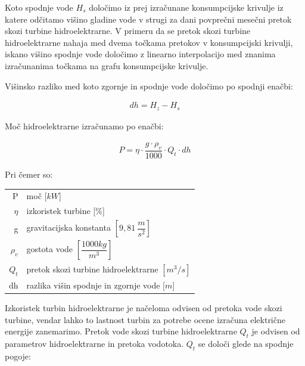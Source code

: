  Koto spodnje vode $H_s$ določimo iz prej izračunane konsumpcijske krivulje iz katere odčitamo višino gladine vode v strugi za dani povprečni mesečni pretok skozi turbine hidroelektrarne. V primeru da se pretok skozi turbine hidroelektrarne nahaja med dvema točkama pretokov v konsumpcijski krivulji, iskano višino spodnje vode določimo z linearno interpolacijo med znanima izračunanima točkama na grafu konsumpcijske krivulje.


Višinsko razliko med koto zgornje in spodnje vode določimo po spodnji enačbi:

\begin{ceqn}
\begin{align}
dh = H_z - H_s
\end{align}
\end{ceqn}

Moč hidroelektrarne izračunamo po enačbi:

\begin{ceqn}
\begin{align}
P = \eta \cdot \dfrac{g \cdot \rho_v}{1000} \cdot Q_t \cdot dh \label{eq:mocHidroelektrarne}
\end{align}
\end{ceqn}

Pri čemer so:
\begin{table}[htb!]
	\begin{tabular}{r|p{10cm}}
		P & moč [$kW$]\\
		$\eta$ & izkoristek turbine [\%]\\
		g & gravitacijska konstanta $\left[9,81~\dfrac{m}{s^{2}}\right]$ \\
		$\rho_v$&gostota vode $\left[\dfrac{1000 kg}{m^3}\right]$\\
		$Q_t$ & pretok skozi turbine hidroelektrarne $\left[m^{3}/s \right]$\\
		dh & razlika višin spodnje in zgornje vode [$m$]
	\end{tabular}
\end{table}




Izkoristek turbin hidroelektrarne je načeloma odvisen od pretoka vode skozi turbine, vendar lahko to lastnost turbin za potrebe ocene izračuna električne energije zanemarimo. Pretok vode skozi turbine hidroelektrarne $Q_t$ je odvisen od parametrov hidroelektrarne in pretoka vodotoka. $Q_t$ se določi glede na spodnje pogoje:


